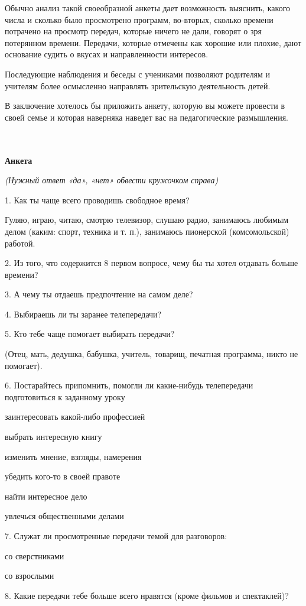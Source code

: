 \documentclass[12pt, a4paper, openany]{book}
\begin{document}
Обычно анализ такой своеобразной анкеты дает возможность выяснить, какого числа и сколько было просмотрено программ, во-вторых, сколько времени потрачено на просмотр передач, которые ничего не дали, говорят о зря потерянном времени. Передачи, которые отмечены как хорошие или плохие, дают основание судить о вкусах и направленности интересов. 

Последующие наблюдения и беседы с учениками позволяют родителям и учителям более осмысленно направлять зрительскую деятельность детей. 

В заключение хотелось бы приложить анкету, которую вы можете провести в своей семье и которая наверняка наведет вас на педагогические размышления. 

\ \\
\ \\
\textbf{Анкета }

\textit{(Нужный ответ «да», «нет» обвести кружочком справа) }

1. Как ты чаще всего проводишь свободное время? 

Гуляю, играю, читаю, смотрю телевизор, слушаю радио, занимаюсь любимым делом (каким: спорт, техника и т. п.), занимаюсь пионерской (комсомольской) работой. 

2. Из того, что содержится 8 первом вопросе, чему бы ты хотел отдавать больше времени? 

3. А чему ты отдаешь предпочтение на самом деле?

4. Выбираешь ли ты заранее телепередачи? 

5. Кто тебе чаще помогает выбирать передачи? 

(Отец, мать, дедушка, бабушка, учитель, товарищ, печатная программа, никто не помогает). 

6. Постарайтесь припомнить, помогли ли какие-нибудь телепередачи подготовиться к заданному уроку 

заинтересовать какой-либо профессией 

выбрать интересную книгу 

изменить мнение, взгляды, намерения 

убедить кого-то в своей правоте 

найти интересное дело 

увлечься общественными делами 

7. Служат ли просмотренные передачи темой для разговоров: 

со сверстниками 

со взрослыми 

8. Какие передачи тебе больше всего нравятся (кроме фильмов и спектаклей)? 
\end{document}
